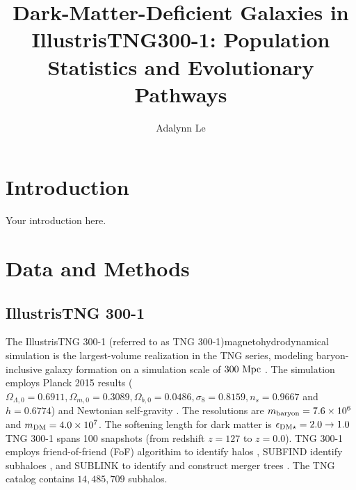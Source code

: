 \documentclass[twocolumn]{openjournal}
\begin{document}
\title{Dark-Matter-Deficient Galaxies in IllustrisTNG300-1:
Population Statistics and Evolutionary Pathways}

\author{Adalynn Le}
\affiliation{}

\begin{abstract}

\end{abstract}


\section{Introduction}
\label{Introduction}
Your introduction here.

\section{Data and Methods}
\label{Data and Methods}

\subsection{IllustrisTNG 300-1}
\label{IllustrisTNG 300-1}

The IllustrisTNG 300-1 (referred to as TNG 300-1)magnetohydrodynamical simulation is the largest-volume realization in the TNG series, modeling baryon-inclusive galaxy formation on a simulation scale of \(300 \textup{ Mpc}\) \cite{nelson2021illustristngsimulationspublicdata,Pillepich_2017,Weinberger_2016}. The simulation employs Planck 2015 results ($\Omega_{\Lambda, 0} = 0.6911, \Omega_{m,0}=0.3089, \Omega_{b,0}=0.0486, \sigma_8=0.8159, n_s=0.9667 $ and $h=0.6774$) and Newtonian self-gravity \cite{Planck2016}. The resolutions are $m_\textup{baryon}=7.6 \times 10^6$ and $m_\textup{DM} = 4.0 \times 10^7$. The softening length for dark matter is $\epsilon_{\textup{DM}\star}=2.0 \rightarrow 1.0$ TNG 300-1 spans 100 snapshots (from redshift $z=127$ to $z=0.0$). TNG 300-1 employs friend-of-friend (FoF)  algorithim to identify halos \cite{1985ApJ...292..371D}, SUBFIND identify subhaloes \cite{2001MNRAS.328..726S}, and SUBLINK to identify and construct merger trees \cite{Rodriguez_Gomez_2016, 2015MNRAS.449...49R}. The TNG catalog contains $14,485,709$ subhalos.
\end{document}
